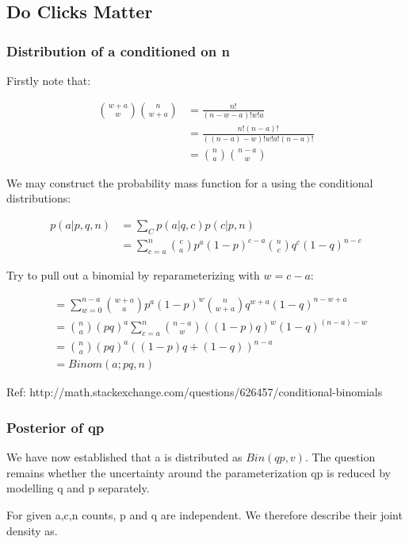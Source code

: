 \documentclass[12pt]{article}
\begin{document}
\subsection{Do Clicks Matter}

\subsubsection{Distribution of a conditioned on n}

Firstly note that:

\begin{align}
{w+a \choose w}{n \choose w+a} &= \frac{n!}{(n-w-a)!w!a} \\
	&= \frac{n!(n-a)!}{((n-a)-w)!w!a!(n-a)!} \\
	&=  {n \choose a}{n-a \choose w}
\end{align}

We may construct the probability mass function for a using the conditional distributions:

\begin{align}
p(a|p,q,n) &= \sum_C p(a|q,c)p(c|p,n) \\
 &= \sum_{c=a}^n {c \choose a} p^a(1-p)^{c-a} {n \choose c} q^c (1-q)^{n-c}
\end{align}

Try to pull out a binomial by reparameterizing with $ w = c-a$:

\begin{align}
&= \sum_{w=0}^{n-a} {w+a \choose a} p^a(1-p)^w {n \choose w+a} q^{w+a} (1-q)^{n-w+a} \\
&= {n \choose a} (pq)^a \sum_{c=a}^n {n-a \choose w} ((1-p)q)^w (1-q)^{(n-a)-w} \\
&= {n \choose a} (pq)^a ((1-p)q +  (1-q))^{n-a} \\
&= Binom(a;pq,n)
\end{align}

Ref: http://math.stackexchange.com/questions/626457/conditional-binomials

\subsubsection{Posterior of qp}

We have now established that a is distributed as $Bin(qp,v)$. The question remains whether the uncertainty around the parameterization qp is reduced by modelling q and p separately.

For given a,c,n counts, p and q are independent. We therefore describe their joint density as.
\end{document}
